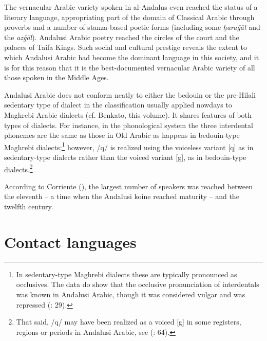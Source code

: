 \documentclass[output=paper,modfonts,nonflat]{langsci/langscibook}
\begin{document}
The vernacular Arabic variety spoken in al-Andalus even reached the status of a literary language, appropriating part of the domain of Classical Arabic through proverbs and a number of stanza-based poetic forms (including some \textit{ḫaraǧāt} and the \textit{azǧāl}). Andalusi Arabic poetry reached the circles of the court and the palaces of Taifa Kings. Such social and cultural prestige reveals the extent to which Andalusi Arabic had become the dominant language in this society, and it is for this reason that it is the best-documented vernacular Arabic variety of all those spoken in the Middle Ages. 

Andalusi Arabic does not conform neatly to either the bedouin or the pre-Hilali sedentary type of dialect in the classification usually applied nowdays to Maghrebi Arabic dialects (cf. Benkato, this volume). It shares features of both types of dialects. For instance, in the phonological system the three interdental phonemes are the same as those in Old Arabic as happens in bedouin-type Maghrebi dialects;\footnote{In sedentary-type Maghrebi dialects these are typically pronounced as occlusives. The data do show that the occlusive pronunciation of interdentals was known in Andalusi Arabic, though it was considered vulgar and was repressed (\citealt{CorrientePereiraVicente2015}: 29).}  however, /q/ is realized using the voiceless variant [q] as in sedentary-type dialects rather than the voiced variant [g], as in bedouin-type dialects.\footnote{That said, /q/ may have been realized as a voiced [g] in some registers, regions or periods in Andalusi Arabic, see (\citealt{CorrientePereiraVicente2015}: 64).}

According to Corriente (\citeyear[34]{Corriente1992}), the largest number of speakers was reached between the eleventh – a time when the Andalusi koine reached maturity – and the twelfth century. 


\section{Contact languages}
\end{document}
